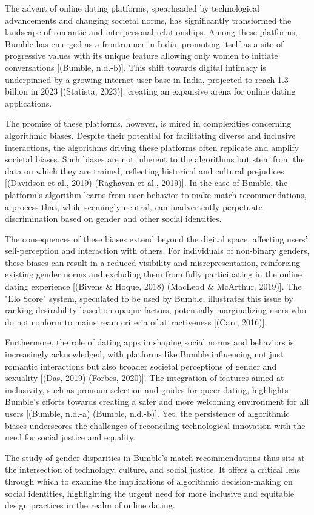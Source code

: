 The advent of online dating platforms, spearheaded by technological advancements and changing societal norms, has significantly transformed the landscape of romantic and interpersonal relationships. Among these platforms, Bumble has emerged as a frontrunner in India, promoting itself as a site of progressive values with its unique feature allowing only women to initiate conversations [(Bumble, n.d.-b)]. This shift towards digital intimacy is underpinned by a growing internet user base in India, projected to reach 1.3 billion in 2023 [(Statista, 2023)], creating an expansive arena for online dating applications.

The promise of these platforms, however, is mired in complexities concerning algorithmic biases. Despite their potential for facilitating diverse and inclusive interactions, the algorithms driving these platforms often replicate and amplify societal biases. Such biases are not inherent to the algorithms but stem from the data on which they are trained, reflecting historical and cultural prejudices [(Davidson et al., 2019) (Raghavan et al., 2019)]. In the case of Bumble, the platform's algorithm learns from user behavior to make match recommendations, a process that, while seemingly neutral, can inadvertently perpetuate discrimination based on gender and other social identities.

The consequences of these biases extend beyond the digital space, affecting users' self-perception and interaction with others. For individuals of non-binary genders, these biases can result in a reduced visibility and misrepresentation, reinforcing existing gender norms and excluding them from fully participating in the online dating experience [(Bivens & Hoque, 2018) (MacLeod & McArthur, 2019)]. The "Elo Score" system, speculated to be used by Bumble, illustrates this issue by ranking desirability based on opaque factors, potentially marginalizing users who do not conform to mainstream criteria of attractiveness [(Carr, 2016)].

Furthermore, the role of dating apps in shaping social norms and behaviors is increasingly acknowledged, with platforms like Bumble influencing not just romantic interactions but also broader societal perceptions of gender and sexuality [(Das, 2019) (Forbes, 2020)]. The integration of features aimed at inclusivity, such as pronoun selection and guides for queer dating, highlights Bumble's efforts towards creating a safer and more welcoming environment for all users [(Bumble, n.d.-a) (Bumble, n.d.-b)]. Yet, the persistence of algorithmic biases underscores the challenges of reconciling technological innovation with the need for social justice and equality.

The study of gender disparities in Bumble's match recommendations thus sits at the intersection of technology, culture, and social justice. It offers a critical lens through which to examine the implications of algorithmic decision-making on social identities, highlighting the urgent need for more inclusive and equitable design practices in the realm of online dating.